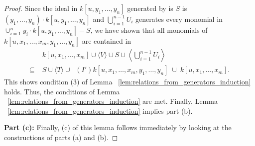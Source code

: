 \documentclass{amsart}
\theoremstyle{plain}
\theoremstyle{definition}
\theoremstyle{remark}
\numberwithin{equation}{section}
\DeclareMathOperator{\initial}{in_\prec}
\begin{document}
\begin{proof}
Since the ideal in $k[u, y_1, \ldots, y_n]$ generated by is $S$ is $(y_1, \ldots, y_n) \cdot k[u, y_1, \ldots, y_n]$ and $\bigcup_{i=1}^{n-1} U_i$ generates every monomial in $\cup_{i=1}^n y_i \cdot k[u, y_1, \ldots, y_n]-S$, we have shown that all monomials of $k[u, x_1, \ldots, x_m, y_1, \ldots, y_n]$ are contained in
\begin{align*}
				& k[u, x_1, \ldots, x_m] \cup \langle V \rangle \cup S \cup \left\langle \bigcup_{i=1}^{n-1} U_i \right\rangle \\
	\subseteq \; 	& S \cup \langle T\rangle \cup \initial(I') k[u, x_1, \ldots, x_m, y_1, \ldots, y_n] \; \cup \; k[u, x_1, \ldots, x_m].
\end{align*}
This shows condition (3) of Lemma ~\ref{lem:relations_from_generators_induction} holds.  Thus, the conditions of 
Lemma ~\ref{lem:relations_from_generators_induction} are met. Finally, Lemma ~\ref{lem:relations_from_generators_induction} implies part (b).  

{\bf Part (c):}
Finally, (c) of this lemma follows immediately by looking at the constructions of parts (a) and (b).  







\end{proof}
\end{document}

